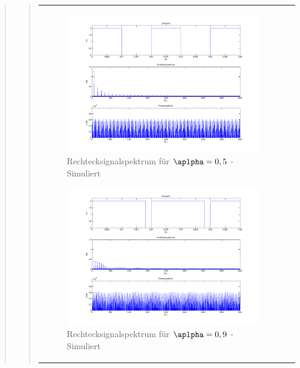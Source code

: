 \begin{quote}
\begin{quote}
\begin{center}
\begin{tabular}{ll}
\begin{minipage}{0.6\textwidth}
                    \begin{figure}[H]
                        \label{fig:}            
                        \includegraphics[scale=0.25]{./Bilder/recht_alpha5.png} %
                        \caption{Rechtecksignalspektrum für $\aplpha = 0,5$ - Simuliert}
                    \end{figure}

                    \begin{figure}[H]
                        \label{fig:}            
                        \includegraphics[scale=0.25]{./Bilder/recht_alpha9.png} %
                        \caption{Rechtecksignalspektrum für $\aplpha = 0,9$ - Simuliert}
                    \end{figure}


\end{minipage}
\end{tabular}
\end{center}
\end{quote}
\end{quote}
